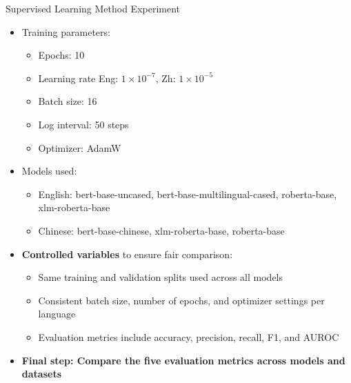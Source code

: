 \documentclass[serif]{beamer}
\begin{document}
\begin{frame}{Supervised Learning Method Experiment}
\begin{itemize}
  \item Training parameters:
  \begin{itemize}
    \item Epochs: 10
    \item Learning rate Eng: \(1 \times 10^{-7}\), Zh: \(1 \times 10^{-5}\)
    \item Batch size: 16
    \item Log interval: 50 steps
    \item Optimizer: AdamW
  \end{itemize}
  \item Models used:
  \begin{itemize}
    \item English: bert-base-uncased, bert-base-multilingual-cased, roberta-base, xlm-roberta-base
    \item Chinese: bert-base-chinese, xlm-roberta-base, roberta-base
  \end{itemize}
  \item \textbf{Controlled variables} to ensure fair comparison:
  \begin{itemize}
    \item Same training and validation splits used across all models
    \item Consistent batch size, number of epochs, and optimizer settings per language
    \item Evaluation metrics include accuracy, precision, recall, F1, and AUROC
  \end{itemize}
  \item \textbf{Final step: Compare the five evaluation metrics across models and datasets}
\end{itemize}
\end{frame}
\end{document}
